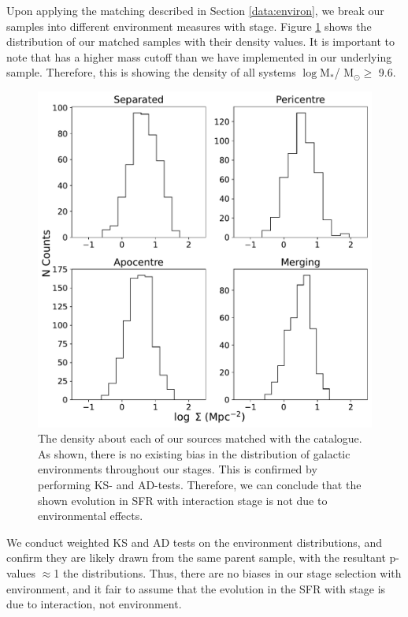 Upon applying the matching described in Section \ref{data:environ}, we break our samples into different environment measures with stage. Figure \ref{fig:dens-stage} shows the distribution of our matched samples with their density values. It is important to note that \citet{2017ApJ...837...16D} has a higher mass cutoff than we have implemented in our underlying sample. Therefore, this is showing the density of all systems $\log$M$_*$/ M$_\odot \geq$ 9.6. 

\begin{figure}
    \centering
    \includegraphics[width=\textwidth]{Chapter3/figures/density-stage.pdf}
    \caption[The density about each of our sources matched with the \citet{2017ApJ...837...16D} catalogue.]{The density about each of our sources matched with the \citet{2017ApJ...837...16D} catalogue. As shown, there is no existing bias in the distribution of galactic environments throughout our stages. This is confirmed by performing KS- and AD-tests. Therefore, we can conclude that the shown evolution in SFR with interaction stage is not due to environmental effects.}
    \label{fig:dens-stage}
\end{figure}

We conduct weighted KS and AD tests on the environment distributions, and confirm they are likely drawn from the same parent sample, with the resultant p-values $\approx$1 the distributions. Thus, there are no biases in our stage selection with environment, and it fair to assume that the evolution in the SFR with stage is due to interaction, not environment.

